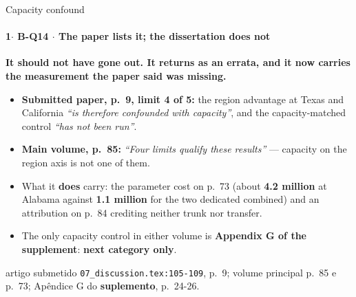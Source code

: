 \documentclass{beamer}
\begin{document}
\begin{frame}[noframenumbering]{Capacity confound}
    \framesubtitle{\normalsize 1$\cdot$ \textbf{B-Q14} $\cdot$ The paper lists it; the dissertation does not}
    \hypertarget{bq14}{}
    \small\textcolor{alert}{\textbf{It should not have gone out. It returns as an errata, and it now carries the measurement the paper said was missing.}}
    \begin{itemize}\setlength{\itemsep}{0pt}\setlength{\parskip}{0pt}
        \item \textbf{Submitted paper, p.~9, limit 4 of 5:} the region advantage at Texas and California \textit{``is therefore confounded with capacity''}, and the capacity-matched control \textit{``has not been run''}.
        \item \textbf{Main volume, p.~85:} \textit{``Four limits qualify these results''} --- capacity on the region axis is not one of them.
        \item What it \textbf{does} carry: the parameter cost on p.~73 (about \textbf{4.2 million} at Alabama against \textbf{1.1 million} for the two dedicated combined) and an attribution on p.~84 crediting neither trunk nor transfer.
        \item The only capacity control in either volume is \textbf{Appendix G of the supplement}: \textbf{next category only}.
    \end{itemize}
    \vfill
    {\scriptsize
    \begin{minipage}[b]{0.775\linewidth}\raggedright\textcolor{black!70}{artigo submetido \texttt{07\_discussion.tex:105-109}, p.~9; volume principal p.~85 e p.~73; Apêndice G do \textbf{suplemento}, p.~24-26.}\end{minipage}\hfill
    \begin{minipage}[b]{0.20\linewidth}\raggedleft \hyperlink{bp1}{}\hyperlink{b0}{}\end{minipage}}
\end{frame}
\end{document}
